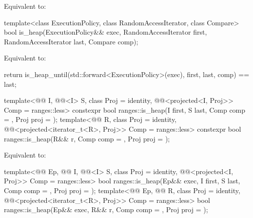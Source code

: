 \begin{itemdescr}
\pnum
\effects
Equivalent to: 
\end{itemdescr}

%
\begin{itemdecl}
template<class ExecutionPolicy, class RandomAccessIterator, class Compare>
  bool is_heap(ExecutionPolicy&& exec,
               RandomAccessIterator first, RandomAccessIterator last,
               Compare comp);
\end{itemdecl}

\begin{itemdescr}
\pnum
\effects
Equivalent to:
\begin{codeblock}
return is_heap_until(std::forward<ExecutionPolicy>(exec), first, last, comp) == last;
\end{codeblock}
\end{itemdescr}

%
\begin{itemdecl}
template<@@ I, @@<I> S, class Proj = identity,
         @@<projected<I, Proj>> Comp = ranges::less>
  constexpr bool ranges::is_heap(I first, S last, Comp comp = {}, Proj proj = {});
template<@@ R, class Proj = identity,
         @@<projected<iterator_t<R>, Proj>> Comp = ranges::less>
  constexpr bool ranges::is_heap(R&& r, Comp comp = {}, Proj proj = {});
\end{itemdecl}

\begin{itemdescr}
\pnum
\effects
Equivalent to:
\end{itemdescr}

\begin{itemdecl}
template<@@ Ep, @@ I, @@<I> S,
         class Proj = identity,
         @@<projected<I, Proj>> Comp = ranges::less>
  bool ranges::is_heap(Ep&& exec, I first, S last, Comp comp = {}, Proj proj = {});
template<@@ Ep, @@ R, class Proj = identity,
         @@<projected<iterator_t<R>, Proj>> Comp = ranges::less>
  bool ranges::is_heap(Ep&& exec, R&& r, Comp comp = {}, Proj proj = {});
\end{itemdecl}

